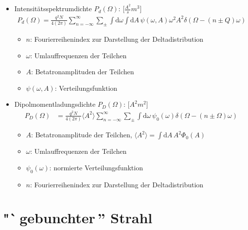 \documentclass[12pt]{article}%
\begin{document}
\begin{itemize}
\item Intensitätsspektrumdichte $P_d(\Omega)$: [$\frac{A^2}{s}m^3$]
\begin{align}
	P_d(\Omega) =\frac{q^2N}{4(2\pi)}\sum_{n=-\infty}^{\infty}\sum_{\pm} \int \mathrm{d}\omega \int \mathrm{d}A \, \psi(\omega, A) \omega^2 A^2 \delta(\Omega - (n \pm Q)\omega)
\end{align}

	\begin{itemize}
		\item $n$: Fourierreihenindex zur Darstellung der Deltadistribution
		\item $\omega$: Umlauffrequenzen der Teilchen
		\item $A$: Betatronamplituden der Teilchen
		\item $\psi(\omega, A)$: Verteilungsfunktion
	\end{itemize}

\item Dipolmomentladungsdichte $P_D(\Omega)$: [$A^2m^2$]
\begin{align}
P_D(\Omega) &= \frac{q^2N}{4(2\pi)} \langle A^2 \rangle \sum_{n=-\infty}^{\infty} \sum_{\pm} \int \mathrm{d}\omega \, \psi_0(\omega) \delta(\Omega - ( n \pm  \Omega) \omega)
\end{align}

	\begin{itemize}
	\item $A$: Betatronamplitude der Teilchen, $\langle A^2 \rangle = \int \mathrm{d}A \, A^2 \Phi_0(A)$
	\item $\omega$: Umlauffrequenzen der Teilchen
	\item $\psi_0(\omega)$: normierte Verteilungsfunktion
	\item $n$: Fourierreihenindex zur Darstellung der Deltadistribution
	\end{itemize}

\end{itemize}
\section{"`\,gebunchter\,'' Strahl}
\end{document}
